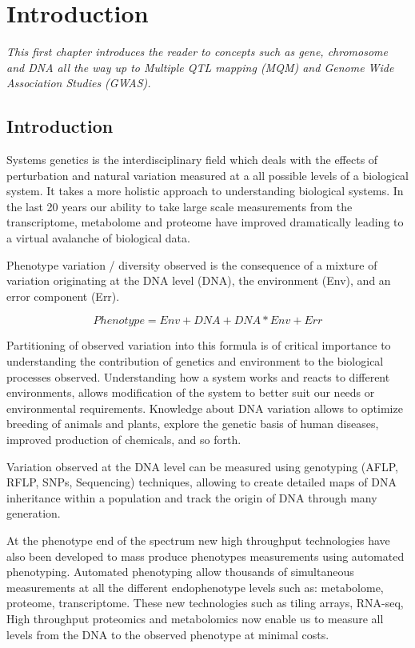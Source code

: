 \chapter{Introduction}
\thispagestyle{empty}
\label{chap:introduction}

\emph{This first chapter introduces the reader to concepts such as gene, chromosome 
and DNA all the way up to Multiple QTL mapping (MQM) and Genome Wide Association Studies 
(GWAS). }

\null
\vfill
\newpage

\section{Introduction}
Systems genetics is the interdisciplinary field which deals with the effects of perturbation 
and natural variation measured at a all possible levels of a biological system. It takes a 
more holistic approach to understanding biological systems. In the last 20 years our ability 
to take large scale measurements from the transcriptome, metabolome and proteome have 
improved dramatically leading to a virtual avalanche of biological data.

Phenotype variation / diversity observed is the consequence of a mixture of variation 
originating at the DNA level (DNA), the environment (Env), and an error component (Err).

$$ Phenotype = Env + DNA + DNA * Env + Err $$

Partitioning of observed variation into this formula is of critical importance 
to understanding the contribution of genetics and environment to the biological 
processes observed. Understanding how a system works and reacts to different 
environments, allows modification of the system to better suit our needs or 
environmental requirements. Knowledge about DNA variation allows to optimize 
breeding of animals and plants, explore the genetic basis of human diseases, 
improved production of chemicals, and so forth.

Variation observed at the DNA level can be measured using genotyping (AFLP, RFLP, 
SNPs, Sequencing) techniques, allowing to create detailed maps of DNA inheritance 
within a population and track the origin of DNA through many generation.

At the phenotype end of the spectrum new high throughput technologies have also 
been developed to mass produce phenotypes measurements using automated phenotyping. 
Automated phenotyping allow thousands of simultaneous measurements at all the 
different endophenotype levels such as: metabolome, proteome, transcriptome. These 
new technologies such as tiling arrays, RNA-seq, High throughput proteomics and 
metabolomics now enable us to measure all levels from the DNA to the observed 
phenotype at minimal costs.

